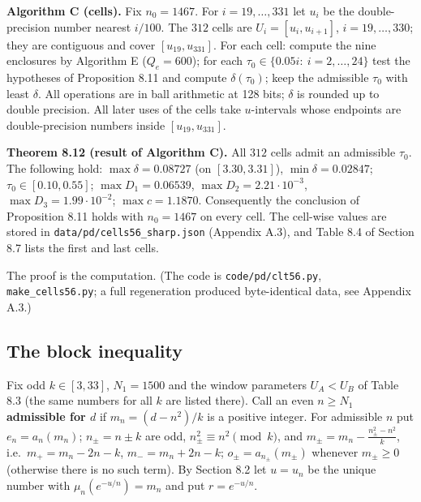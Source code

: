 \textbf{Algorithm C (cells).} Fix \(n_0=1467\). For \(i=19,\dots,331\) let \(u_i\) be the double-precision number nearest \(i/100\). The \(312\) cells are \(U_i=[u_i,u_{i+1}]\), \(i=19,\dots,330\); they are contiguous and cover \([u_{19},u_{331}]\). For each cell: compute the nine enclosures by Algorithm E (\(Q_e=600\)); for each \(\tau_0\in\{0.05i:\ i=2,\dots,24\}\) test the hypotheses of Proposition 8.11 and compute \(\delta(\tau_0)\); keep the admissible \(\tau_0\) with least \(\delta\). All operations are in ball arithmetic at 128 bits; \(\delta\) is rounded up to double precision. All later uses of the cells take \(u\)-intervals whose endpoints are double-precision numbers inside \([u_{19},u_{331}]\).

\textbf{Theorem 8.12 (result of Algorithm C).} All \(312\) cells admit an admissible \(\tau_0\). The following hold: \(\max\delta=0.08727\) (on \([3.30,3.31]\)), \(\min\delta=0.02847\); \(\tau_0\in[0.10,0.55]\); \(\max D_1=0.06539\), \(\max D_2=2.21\cdot10^{-3}\), \(\max D_3=1.99\cdot10^{-2}\); \(\max c=1.1870\). Consequently the conclusion of Proposition 8.11 holds with \(n_0=1467\) on every cell. The cell-wise values are stored in \texttt{data/pd/cells56\_sharp.json} (Appendix A.3), and Table 8.4 of Section 8.7 lists the first and last cells.

The proof is the computation. (The code is \texttt{code/pd/clt56.py}, \texttt{make\_cells56.py}; a full regeneration produced byte-identical data, see Appendix A.3.)

\subsection{The block inequality}\label{the-block-inequality}

Fix odd \(k\in[3,33]\), \(N_1=1500\) and the window parameters \(U_A<U_B\) of Table 8.3 (the same numbers for all \(k\) are listed there). Call an even \(n\ge N_1\) \textbf{admissible for \(d\)} if \(m_n=(d-n^2)/k\) is a positive integer. For admissible \(n\) put \(e_n=a_n(m_n)\); \(n_\pm=n\pm k\) are odd, \(n_\pm^2\equiv n^2\pmod k\), and \(m_\pm=m_n-\frac{n_\pm^2-n^2}k\), i.e.~\(m_+=m_n-2n-k\), \(m_-=m_n+2n-k\); \(o_\pm=a_{n_\pm}(m_\pm)\) whenever \(m_\pm\ge0\) (otherwise there is no such term). By Section 8.2 let \(u=u_n\) be the unique number with \(\mu_n(e^{-u/n})=m_n\) and put \(r=e^{-u/n}\).

